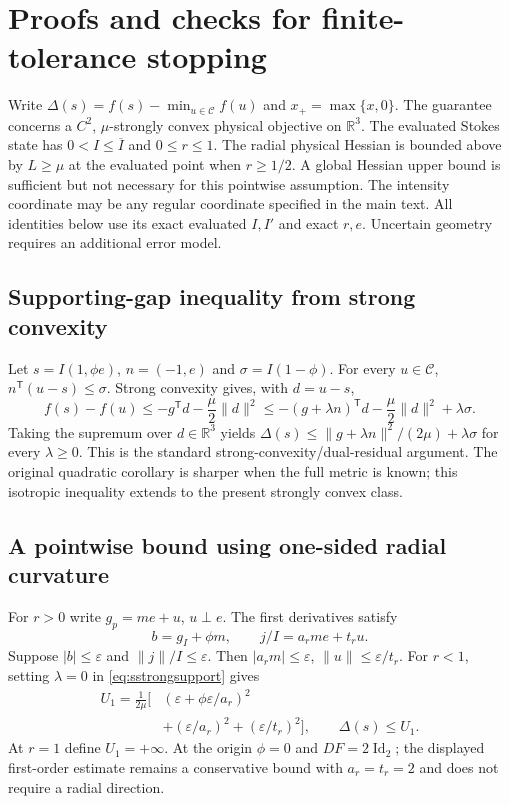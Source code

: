 \section{Proofs and checks for finite-tolerance stopping}
\label{sec:sstopproof}
Write $\Delta(s)=f(s)-\min_{u\in\mathcal C}f(u)$ and $x_+=\max\{x,0\}$.
The guarantee concerns a $C^2$, $\mu$-strongly convex physical objective on $\mathbb R^3$. The evaluated Stokes state has $0<I\le\overline I$ and $0\le r\le1$. The radial physical Hessian is bounded above by $L\ge\mu$ at the evaluated point when $r\ge1/2$. A global Hessian upper bound is sufficient but not necessary for this pointwise assumption. The intensity coordinate may be any regular coordinate specified in the main text. All identities below use its exact evaluated $I,I'$ and exact $r,e$. Uncertain geometry requires an additional error model.

\subsection{Supporting-gap inequality from strong convexity}
Let $s=I(1,\phi e)$, $n=(-1,e)$ and $\sigma=I(1-\phi)$. For every $u\in\mathcal C$, $n^{\mathsf T}(u-s)\le\sigma$. Strong convexity gives, with $d=u-s$,
\begin{equation}
 f(s)-f(u)\le-g^{\mathsf T}d-\frac\mu2\|d\|^2
 \le-(g+\lambda n)^{\mathsf T}d-\frac\mu2\|d\|^2+\lambda\sigma.
 \label{eq:sstrongsupport}
\end{equation}
Taking the supremum over $d\in\mathbb R^3$ yields $\Delta(s)\le\|g+\lambda n\|^2/(2\mu)+\lambda\sigma$ for every $\lambda\ge0$. This is the standard strong-convexity/dual-residual argument. The original quadratic corollary is sharper when the full metric is known; this isotropic inequality extends to the present strongly convex class.

\subsection{A pointwise bound using one-sided radial curvature}
For $r>0$ write $g_p=me+u$, $u\perp e$. The first derivatives satisfy
\begin{equation}
 b=g_I+\phi m,\qquad j/I=a_rm e+t_ru.
 \label{eq:sstopdecomposition}
\end{equation}
Suppose $|b|\le\varepsilon$ and $\|j\|/I\le\varepsilon$. Then $|a_rm|\le\varepsilon$, $\|u\|\le\varepsilon/t_r$. For $r<1$, setting $\lambda=0$ in \eqref{eq:sstrongsupport} gives
\begin{equation}
 \begin{aligned}
 U_1=\frac1{2\mu}\bigl[&(\varepsilon+\phi\varepsilon/a_r)^2\\
              &+(\varepsilon/a_r)^2+(\varepsilon/t_r)^2\bigr],\qquad
 \Delta(s)\le U_1.
 \end{aligned}
 \label{eq:sstopfirst}
\end{equation}
At $r=1$ define $U_1=+\infty$. At the origin $\phi=0$ and $DF=2\operatorname{Id}_2$; the displayed first-order estimate remains a conservative bound with $a_r=t_r=2$ and does not require a radial direction.

